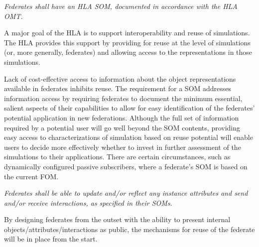 \vspace{10.8pt}

\vspace{-2.4pt}

\textit{Federates shall have an HLA SOM, documented in accordance with the HLA OMT.}

\vspace{6.1pt}
A major goal of the HLA is to support interoperability and reuse of simulations. The HLA provides this\linebreak
support by providing for reuse at the level of simulations (or, more generally, federates) and allowing access\linebreak
to the representations in those simulations.

\vspace{6.1pt}
Lack of cost-effective access to information about the object representations available in federates inhibits\linebreak
reuse. The requirement for a SOM addresses information access by requiring federates to document the\linebreak
minimum essential, salient aspects of their capabilities to allow for easy identification of the federates'\linebreak
potential application in new federations. Although the full set of information required by a potential user\linebreak
will go well beyond the SOM contents, providing easy access to characterizations of simulation based on\linebreak
reuse potential will enable users to decide more effectively whether to invest in further assessment of the\linebreak
simulations to their applications. There are certain circumstances, such as dynamically configured passive\linebreak
subscribers, where a federate's SOM is based on the current FOM.

\endgroup
\newpage
\begingroup
\addtolength{\topskip}{-1.05pt}

\textit{Federates shall be able to update and/or reflect any instance attributes and send and/or receive interactions,\linebreak
as specified in their SOMs.}

\vspace{6.1pt}
By designing federates from the outset with the ability to present internal objects/attributes/interactions as\linebreak
public, the mechanisms for reuse of the federate will be in place from the start.

